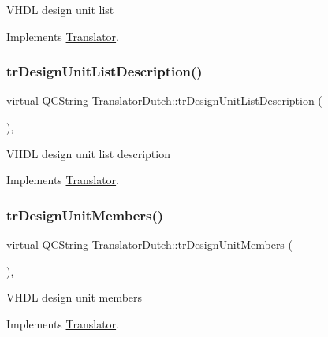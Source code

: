 V\+H\+DL design unit list 

Implements \mbox{\hyperlink{class_translator}{Translator}}.

\mbox{\label{class_translator_dutch_a5e6fea2b506783b4afde1f95630b98d4}} 
\subsubsection{\texorpdfstring{trDesignUnitListDescription()}{trDesignUnitListDescription()}}
{\footnotesize\ttfamily virtual \mbox{\hyperlink{class_q_c_string}{Q\+C\+String}} Translator\+Dutch\+::tr\+Design\+Unit\+List\+Description (\begin{DoxyParamCaption}{ }\end{DoxyParamCaption})\hspace{0.3cm}{\ttfamily [inline]}, {\ttfamily [virtual]}}

V\+H\+DL design unit list description 

Implements \mbox{\hyperlink{class_translator}{Translator}}.

\mbox{\label{class_translator_dutch_ab4bf65cba08b1bb1635cc8c7000a969a}} 
\subsubsection{\texorpdfstring{trDesignUnitMembers()}{trDesignUnitMembers()}}
{\footnotesize\ttfamily virtual \mbox{\hyperlink{class_q_c_string}{Q\+C\+String}} Translator\+Dutch\+::tr\+Design\+Unit\+Members (\begin{DoxyParamCaption}{ }\end{DoxyParamCaption})\hspace{0.3cm}{\ttfamily [inline]}, {\ttfamily [virtual]}}

V\+H\+DL design unit members 

Implements \mbox{\hyperlink{class_translator}{Translator}}.

\mbox{\label{class_translator_dutch_a87861df73da33dea1dacd025fbe96d57}} 
